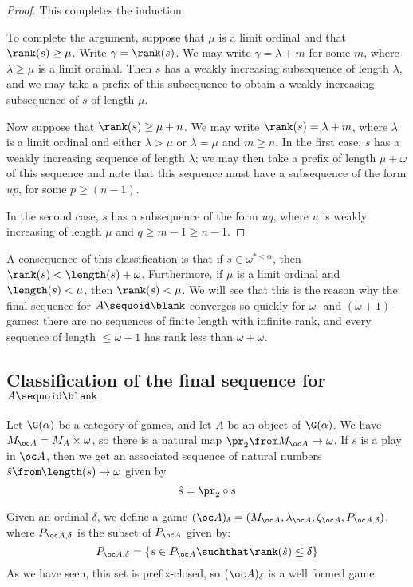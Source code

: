 \documentclass[11pt]{article} %
\begin{document}
\begin{theorem}
\begin{proof}
    This completes the induction.  

    To complete the argument, suppose that $\mu$ is a limit ordinal and that $\rank(s)\ge\mu$.  Write $\gamma=\rank(s)$.  We may write $\gamma=\lambda+m$ for some $m$, where $\lambda\ge\mu$ is a limit ordinal.  Then $s$ has a weakly increasing subsequence of length $\lambda$, and we may take a prefix of this subsequence to obtain a weakly increasing subsequence of $s$ of length $\mu$.  

    Now suppose that $\rank(s)\ge\mu+n$.  We may write $\rank(s) = \lambda+m$, where $\lambda$ is a limit ordinal and either $\lambda>\mu$ or $\lambda=\mu$ and $m\ge n$.  In the first case, $s$ has a weakly increasing sequence of length $\lambda$; we may then take a prefix of length $\mu+\omega$ of this sequence and note that this sequence must have a subsequence of the form $up$, for some $p\ge (n-1)$.  

    In the second case, $s$ has a subsequence of the form $uq$, where $u$ is weakly increasing of length $\mu$ and $q\ge m-1\ge n-1$.  
  \end{proof}
\end{theorem}

A consequence of this classification is that if $s\in\omega^{*<\alpha}$, then $\rank(s)<\length(s)+\omega$.  Furthermore, if $\mu$ is a limit ordinal and $\length(s)<\mu$, then $\rank(s)<\mu$.  We will see that this is the reason why the final sequence for $A\sequoid\blank$ converges so quickly for $\omega$- and $(\omega+1)$-games: there are no sequences of finite length with infinite rank, and every sequence of length $\le \omega+1$ has rank less than $\omega+\omega$.  

\subsection{Classification of the final sequence for $A\sequoid\protect\blank$}

Let $\G(\alpha)$ be a category of games, and let $A$ be an object of $\G(\alpha)$.  We have $M_{\oc A}=M_A\times\omega$, so there is a natural map $\pr_2\from M_{\oc A}\to \omega$.  If $s$ is a play in $\oc A$, then we get an associated sequence of natural numbers $\hat s\from\length(s)\to\omega$ given by\[
  \hat s = \pr_2 \circ s
  \]

Given an ordinal $\delta$, we define a game $(\oc A)_\delta=(M_{\oc A},\lambda_{\oc A}, \zeta_{\oc A}, P_{\oc A,\delta})$, where $P_{\oc A,\delta}$ is the subset of $P_{\oc A}$ given by:
\[
  P_{\oc A,\delta} = \{s\in P_{\oc A}\suchthat \rank(\hat s)\le\delta\}
  \]
As we have seen, this set is prefix-closed, so $(\oc A)_\delta$ is a well formed game.  
\end{document}
